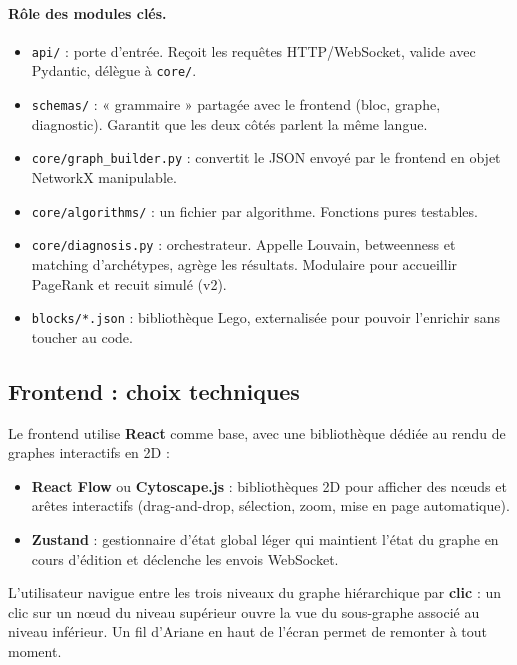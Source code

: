 \documentclass[11pt,a4paper]{article}
\begin{document}
\paragraph{Rôle des modules clés.}

\begin{itemize}[leftmargin=*]
    \item \texttt{api/} : porte d'entrée. Reçoit les requêtes HTTP/WebSocket, valide avec Pydantic, délègue à \texttt{core/}.
    \item \texttt{schemas/} : « grammaire » partagée avec le frontend (bloc, graphe, diagnostic). Garantit que les deux côtés parlent la même langue.
    \item \texttt{core/graph\_builder.py} : convertit le JSON envoyé par le frontend en objet NetworkX manipulable.
    \item \texttt{core/algorithms/} : un fichier par algorithme. Fonctions pures testables.
    \item \texttt{core/diagnosis.py} : orchestrateur. Appelle Louvain, betweenness et matching d'archétypes, agrège les résultats. Modulaire pour accueillir PageRank et recuit simulé (v2).
    \item \texttt{blocks/*.json} : bibliothèque Lego, externalisée pour pouvoir l'enrichir sans toucher au code.
\end{itemize}

\subsection{Frontend : choix techniques}

Le frontend utilise \textbf{React} comme base, avec une bibliothèque dédiée au rendu de graphes interactifs en 2D :
\begin{itemize}[leftmargin=*]
    \item \textbf{React Flow} ou \textbf{Cytoscape.js} : bibliothèques 2D pour afficher des nœuds et arêtes interactifs (drag-and-drop, sélection, zoom, mise en page automatique).
    \item \textbf{Zustand} : gestionnaire d'état global léger qui maintient l'état du graphe en cours d'édition et déclenche les envois WebSocket.
\end{itemize}

L'utilisateur navigue entre les trois niveaux du graphe hiérarchique par \textbf{clic} : un clic sur un nœud du niveau supérieur ouvre la vue du sous-graphe associé au niveau inférieur. Un fil d'Ariane en haut de l'écran permet de remonter à tout moment.
\end{document}
